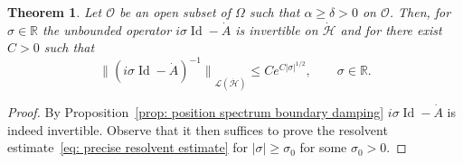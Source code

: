 \documentclass[10pt]{amsart}
\theoremstyle{plain}
\newtheorem{theorem}{Theorem}[section]
\theoremstyle{definition}
\def\R{\mathbb{R}}
\renewcommand{\H}{{\mathcal H}}
\newcommand{\scrO}{\mathscr O}
\newcommand{\Norm}[2]{{\| #1 \|}_{#2}}
\DeclareMathOperator{\id}{Id}
\begin{document}
\begin{theorem}\label{res}
Let $\scrO$ be an open subset of $\Omega$ such that $\alpha\geq
\delta>0$ on $\scrO$. Then, for $\sigma \in \R$ the unbounded
operator $i\sigma\id -\dot {A}$ is invertible on $\dot \H$ and
for there exist $C>0$ such that
\begin{equation}
\label{eq: precise resolvent estimate}
\Norm{ (i\sigma\id-\dot{A})^{-1}}{\mathcal{L}(\dot{\H})}
\leq C e^{C |\sigma|^{1/2}}, \qquad \sigma \in \R.
\end{equation}
\end{theorem}
\begin{proof}
By Proposition~\ref{prop: position spectrum boundary damping}
$i\sigma\id -\dot {A}$ is indeed invertible. Observe that it then
suffices to prove the resolvent estimate~\eqref{eq: precise resolvent
estimate} for $|\sigma| \geq \sigma_0$ for some $\sigma_0>0$.


\end{proof}
\end{document}
